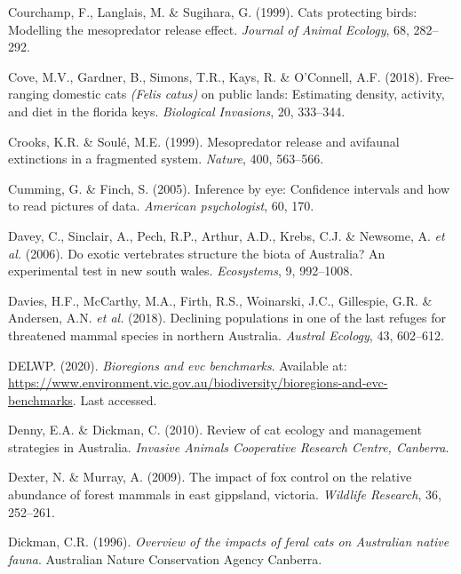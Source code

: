 \documentclass[11pt,a4paper,titlepage,twoside,openright]{style/unimelbthesis}
\begin{document}
\begin{mainmatter}
\leavevmode\hypertarget{ref-courchamp1999cats}{}%
Courchamp, F., Langlais, M. \& Sugihara, G. (1999). Cats protecting birds: Modelling the mesopredator release effect. \emph{Journal of Animal Ecology}, 68, 282--292.

\leavevmode\hypertarget{ref-cove2018free}{}%
Cove, M.V., Gardner, B., Simons, T.R., Kays, R. \& O'Connell, A.F. (2018). Free-ranging domestic cats \emph{(Felis catus)} on public lands: Estimating density, activity, and diet in the florida keys. \emph{Biological Invasions}, 20, 333--344.

\leavevmode\hypertarget{ref-crooks1999mesopredator}{}%
Crooks, K.R. \& Soulé, M.E. (1999). Mesopredator release and avifaunal extinctions in a fragmented system. \emph{Nature}, 400, 563--566.

\leavevmode\hypertarget{ref-cumming2005inference}{}%
Cumming, G. \& Finch, S. (2005). Inference by eye: Confidence intervals and how to read pictures of data. \emph{American psychologist}, 60, 170.

\leavevmode\hypertarget{ref-davey2006exotic}{}%
Davey, C., Sinclair, A., Pech, R.P., Arthur, A.D., Krebs, C.J. \& Newsome, A. \emph{et al.} (2006). Do exotic vertebrates structure the biota of Australia? An experimental test in new south wales. \emph{Ecosystems}, 9, 992--1008.

\leavevmode\hypertarget{ref-davies2018declining}{}%
Davies, H.F., McCarthy, M.A., Firth, R.S., Woinarski, J.C., Gillespie, G.R. \& Andersen, A.N. \emph{et al.} (2018). Declining populations in one of the last refuges for threatened mammal species in northern Australia. \emph{Austral Ecology}, 43, 602--612.

\leavevmode\hypertarget{ref-delwp2020}{}%
DELWP. (2020). \emph{Bioregions and evc benchmarks}. Available at: \url{https://www.environment.vic.gov.au/biodiversity/bioregions-and-evc-benchmarks}. Last accessed.

\leavevmode\hypertarget{ref-denny2010review}{}%
Denny, E.A. \& Dickman, C. (2010). Review of cat ecology and management strategies in Australia. \emph{Invasive Animals Cooperative Research Centre, Canberra}.

\leavevmode\hypertarget{ref-dexter2009impact}{}%
Dexter, N. \& Murray, A. (2009). The impact of fox control on the relative abundance of forest mammals in east gippsland, victoria. \emph{Wildlife Research}, 36, 252--261.

\leavevmode\hypertarget{ref-dickman1996overview}{}%
Dickman, C.R. (1996). \emph{Overview of the impacts of feral cats on Australian native fauna}. Australian Nature Conservation Agency Canberra.


\end{mainmatter}
\end{document}
